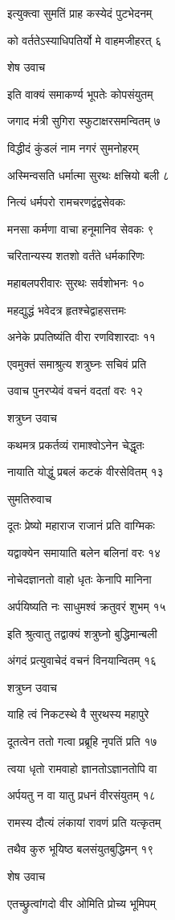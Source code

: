 इत्युक्त्वा सुमतिं प्राह कस्येदं पुटभेदनम्

को वर्ततेऽस्याधिपतिर्यो मे वाहमजीहरत् ६

शेष उवाच

इति वाक्यं समाकर्ण्य भूपतेः कोपसंयुतम्

जगाद मंत्री सुगिरा स्फुटाक्षरसमन्वितम् ७

विद्धीदं कुंडलं नाम नगरं सुमनोहरम्

अस्मिन्वसति धर्मात्मा सुरथः क्षत्त्रियो बली ८

नित्यं धर्मपरो रामचरणद्वंद्वसेवकः

मनसा कर्मणा वाचा हनूमानिव सेवकः ९

चरितान्यस्य शतशो वर्तंते धर्मकारिणः

महाबलपरीवारः सुरथः सर्वशोभनः १०

महद्युद्धं भवेदत्र हृतश्चेद्वाहसत्तमः

अनेके प्रपतिष्यंति वीरा रणविशारदाः ११

एवमुक्तं समाश्रुत्य शत्रुघ्नः सचिवं प्रति

उवाच पुनरप्येवं वचनं वदतां वरः १२

शत्रुघ्न उवाच

कथमत्र प्रकर्तव्यं रामाश्वोऽनेन चेद्धृतः

नायाति योद्धुं प्रबलं कटकं वीरसेवितम् १३

सुमतिरुवाच

दूतः प्रेष्यो महाराज राजानं प्रति वाग्मिकः

यद्वाक्येन समायाति बलेन बलिनां वरः १४

नोचेदज्ञानतो वाहो धृतः केनापि मानिना

अर्पयिष्यति नः साधुमश्वं क्रतुवरं शुभम् १५

इति श्रुत्वातु तद्वाक्यं शत्रुघ्नो बुद्धिमान्बली

अंगदं प्रत्युवाचेदं वचनं विनयान्वितम् १६

शत्रुघ्न उवाच

याहि त्वं निकटस्थे वै सुरथस्य महापुरे

दूतत्वेन ततो गत्वा प्रब्रूहि नृपतिं प्रति १७

त्वया धृतो रामवाहो ज्ञानतोऽज्ञानतोपि वा

अर्पयतु न वा यातु प्रधनं वीरसंयुतम् १८

रामस्य दौत्यं लंकायां रावणं प्रति यत्कृतम्

तथैव कुरु भूयिष्ठ बलसंयुतबुद्धिमन् १९

शेष उवाच

एतच्छ्रुत्वांगदो वीर ओमिति प्रोच्य भूमिपम्

